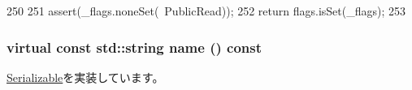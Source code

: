 \begin{DoxyCode}
250     {
251         assert(_flags.noneSet(~PublicRead));
252         return flags.isSet(_flags);
253     }
\end{DoxyCode}
\hypertarget{classEvent_adbcff144e5e199d332a1352af1798148}{
\subsubsection[{name}]{\setlength{\rightskip}{0pt plus 5cm}virtual const std::string name () const}}
\label{classEvent_adbcff144e5e199d332a1352af1798148}


\hyperlink{classSerializable_a2d319721a65496069642871a52e47056}{Serializable}を実装しています。

